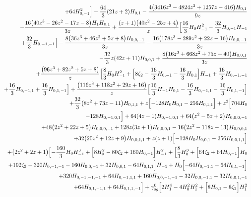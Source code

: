 \begin{eqnarray}
\nonumber \\ &&
+64H_{0,-1}^2\Bigr]-\frac{64}{3}  (21 z+2) H_{0,1}-\frac{4 \big(3416  z^3-4824 z^2+1257 z-416\big) H_{0,1}}{9 z}
\nonumber \\ &&
-\frac{16 \big(40 z^3-26 z^2-17  z-8\big) H_1 H_{0,1}}{3 z}
+\frac{(z+1) \big(40 z^2-25 z+4\big) }{z} \Bigl[\frac{16}{3}  H_0 H_{-1}^2-\frac{32}{3}  H_{0,-1}  H_{-1}
\nonumber \\ &&
+\frac{32}{3}  H_{0,-1,-1}\Bigr]
-\frac{8 \big(36 z^3+46 z^2+5  z+8\big) H_{0,0,-1}}{3 z}-\frac{16  \big(178 z^3-289 z^2+22 z-16\big)  H_{0,0,-1}}{3 z}
\nonumber \\ &&
-\frac{32}{3}  z (42 z+11) H_{0,0,1}+\frac{8 \big(16  z^3+668 z^2+75 z+40\big) H_{0,0,1}}{3 z}
\nonumber \\ &&
+\frac{\big(96 z^3+82 z^2+5 z+8\big) }{z}
 \Bigl[\frac{8}{3} H_0 H_{-1}^2+\Bigl[8 \zeta_2-\frac{16}{3}  H_{0,-1}-\frac{16}{3} H_{0,1}\Bigr] H_{-1}+\frac{16}{3}  H_{0,-1,-1}
\nonumber \\ &&
+\frac{16}{3} H_{0,-1,1}+\frac{16}{3}  H_{0,1,-1}\Bigr]
+\frac{\big(116 z^3+118 z^2+29 z+16\big) }{z}
 \Bigl[\frac{16}{3}  H_{-1} H_{0,1}-\frac{16}{3}   H_{0,-1,1}-\frac{16}{3}  H_{0,1,-1}\Bigr]
\nonumber \\ &&
+\frac{32}{3} \big(8z^2+73 z-11\big) H_{0,1,1}+z \Bigl[-128  H_0 H_{0,1}-256 H_{0,1,1}\Bigr]+z^2 \Bigl[704  H_0
\nonumber \\ &&
-128 H_{0,-1,0,1}\Bigr]+64  (4 z-1)H_{0,-1,0,1}+64 \big(z^2-5 z+2\big) H_{0,0,0,-1}
\nonumber \\ &&
+48  \big(2 z^2+22z+5\big) H_{0,0,0,-1}+128  z (3 z+1) H_{0,0,0,1}-16 \big(2 z^2-118z-13\big) H_{0,0,0,1}
\nonumber \\ &&
+32 \big(20 z^2+12 z+9\big) H_{0,0,1,1}+z (z+1) \Bigl[-128 H_0 H_{0,0,1}-256  H_{0,0,1,1}\Bigr]
\nonumber \\ &&
+\big(2 z^2+2 z+1\big)\Bigl[-\frac{160}{3} H_0 H_{-1}^3+\Bigl[8 H_0^2-80 \zeta_2
+160H_{0,-1}\Bigr] H_{-1}^2+\Bigl[\frac{8}{3} H_0^3
+\Bigl[64 \zeta_2+64 H_{0,-1}\Bigr] H_0
\nonumber \\ &&
+192 \zeta_3-320 H_{0,-1,-1}
-160 H_{0,0,-1}+32H_{0,0,1}-64H_{0,1,1}\Bigr] H_{-1}
+H_0 \Bigl[-64  H_{0,-1,1}-64 H_{0,1,-1}\Bigr]
\nonumber \\ &&
+320 H_{0,-1,-1,-1}
+64H_{0,-1,1,1}
+160 H_{0,0,-1,-1}-32 H_{0,0,-1,1}-32H_{0,0,1,-1}\nonumber \\ &&
+64H_{0,1,-1,1}+64 H_{0,1,1,-1}\Bigr]+{\gamma}_{qg}^{0}\Bigl[2 H_1^4-4 H_0^2 H_1^2+\Bigl[8 H_{0,1}-8 \zeta_2\Bigr]H_1^2
\nonumber \\ &&

\end{eqnarray}
